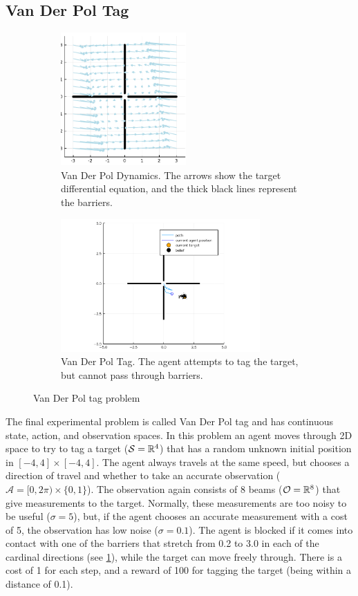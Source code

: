 \subsection{Van Der Pol Tag} \label{sec:vdptag}

\begin{figure}[bth]
    \begin{subfigure}{0.48\linewidth}
        \centering
        \includegraphics[height=2in]{media/vdp_quiver.pdf}
        \caption{Van Der Pol Dynamics. The arrows show the target differential equation, and the thick black lines represent the barriers.}
    \end{subfigure}
    \hfill
    \begin{subfigure}{0.48\linewidth}
        \includegraphics[height=2in]{media/vdptag.png}
        \caption{Van Der Pol Tag. The agent attempts to tag the target, but cannot pass through barriers.}
    \end{subfigure}
    \caption[Van Der Pol tag problem]{Van Der Pol tag problem}
    \label{fig:vdp}
\end{figure}


The final experimental problem is called Van Der Pol tag and has continuous state, action, and observation spaces.
In this problem an agent moves through 2D space to try to tag a target ($\mathcal{S}=\mathbb{R}^4$) that has a random unknown initial position in $[-4, 4]\times[-4,4]$.
The agent always travels at the same speed, but chooses a direction of travel and whether to take an accurate observation ($\mathcal{A} = [0, 2\pi)\times\{0,1\}$).
The observation again consists of 8 beams ($\mathcal{O}=\mathbb{R}^8$) that give measurements to the target.
Normally, these measurements are too noisy to be useful ($\sigma=5$), but, if the agent chooses an accurate measurement with a cost of \num{5}, the observation has low noise ($\sigma=0.1$).
The agent is blocked if it comes into contact with one of the barriers that stretch from \num{0.2} to \num{3.0} in each of the cardinal directions (see \cref{fig:vdp}), while the target can move freely through.
There is a cost of \num{1} for each step, and a reward of \num{100} for tagging the target (being within a distance of \num{0.1}).


